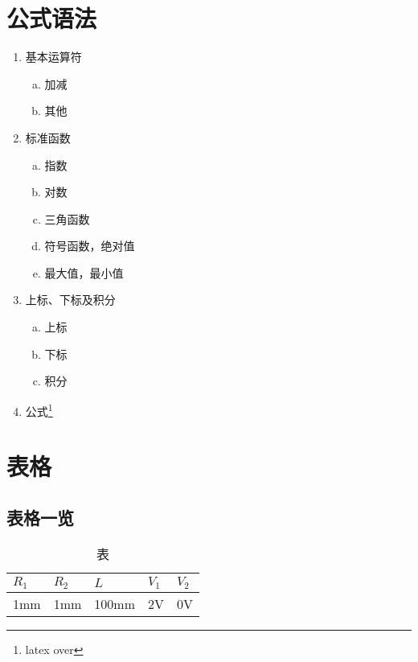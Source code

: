 \documentclass[12pt,a4paper]{article}%
\begin{document}
\section{公式语法}
\begin{enumerate}[1.]%
    \item 基本运算符
    \begin{enumerate}[(a)]%
        \item 加减%
        \item 其他%
    \end{enumerate}

    \item  标准函数
    \begin{enumerate}[(a)]%
    \item 指数 %
    \item 对数 %
    \item 三角函数 %
    \item 符号函数，绝对值 %
    \item 最大值，最小值 %
    \end{enumerate}

    \item 上标、下标及积分
    \begin{enumerate}[(a)]%
        \item 上标%
        \item 下标%
        \item 积分%
    \end{enumerate}

    \item 公式\footnote{latex over}%
\end{enumerate}

\section{表格}
\subsection{表格一览}
\begin{table}[H]%
	\centering
	\begin{tabular}{|l|l|l|l|l|}
		\hline
		$R_1$ & $R_2$ & $L$ & $V_1$ & $V_2$ \\ \hline
		1mm & 1mm & 100mm & 2V & 0V \\ \hline
	\end{tabular}
\caption{\fontsize{10pt}{15pt}\selectfont 表}
\end{table}
\end{document}

